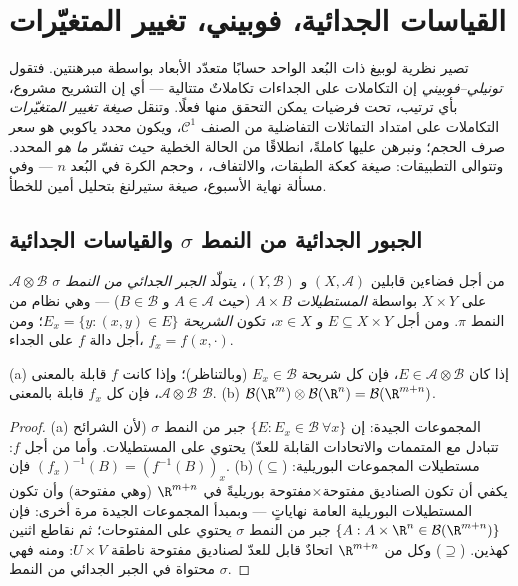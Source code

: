 \chapter{القياسات الجدائية، فوبيني، تغيير المتغيّرات}
\label{ch:b3:product}

تصير نظرية لوبيغ ذات البُعد الواحد حسابًا متعدّد الأبعاد بواسطة
مبرهنتين. فتقول \emph{تونيلي--فوبيني} إن التكاملات على الجداءات
تكاملاتٌ متتالية --- أي إن التشريح مشروع، بأي ترتيب، تحت فرضيات
يمكن التحقق منها فعلًا. وتنقل \emph{صيغة تغيير المتغيّرات}
التكاملات على امتداد التماثلات التفاضلية من الصنف $\mathcal C^1$،
ويكون محدد ياكوبي هو سعر صرف الحجم؛ ونبرهن عليها كاملةً، انطلاقًا
من الحالة الخطية حيث تفسّر \emph{ما هو} المحدد. وتتوالى
التطبيقات: صيغة كعكة الطبقات، والالتفاف، ،
وحجم الكرة في البُعد $n$ --- وفي مسألة نهاية الأسبوع، صيغة
ستيرلنغ بتحليل أمين للخطأ.

\section{الجبور الجدائية من النمط $\sigma$ والقياسات الجدائية}

\begin{definition}\label{def:b3:product:sigma}
من أجل فضاءين قابلين  $(X, \mathcal A)$ و $(Y, \mathcal B)$، يتولّد \emph{الجبر
الجدائي من النمط $\sigma$}
$\mathcal A \otimes \mathcal B$ على $X \times
Y$ بواسطة \emph{المستطيلات} $A \times B$ (حيث $A \in
\mathcal A$
و $B \in \mathcal B$) --- وهي نظام من النمط $\pi$. ومن أجل $E
\subseteq X\times Y$ و $x \in X$،
تكون \emph{الشريحة} $E_x
= \{y : (x,y) \in E\}$؛ ومن أجل دالة $f$ على الجداء،
$f_x = f(x, \cdot)$.
\end{definition}

\begin{proposition}\label{prop:b3:product:sections}
(a) إذا كان $E \in \mathcal A\otimes\mathcal B$، فإن كل شريحة $E_x
\in \mathcal B$ (وبالتناظر)؛ وإذا كانت
$f$ قابلة  بالمعنى $\mathcal
A\otimes\mathcal B$، فإن كل $f_x$ قابلة 
بالمعنى $\mathcal
B$.
(b) $\mathcal B(\R^m)\otimes\mathcal B(\R^n) = \mathcal
B(\R^{m+n})$.
\end{proposition}

\begin{proof}
(a) المجموعات الجيدة: إن $\{E : E_x \in \mathcal B\ \forall x\}$ جبر من النمط $\sigma$ (لأن
الشرائح تتبادل مع المتممات والاتحادات القابلة للعدّ) يحتوي على
المستطيلات. وأما من أجل $f$: فإن $(f_x)^{-1}(B) = (f^{-1}(B))_x$.
(b) ($\subseteq$) مستطيلات المجموعات البوريلية: يكفي أن تكون
الصناديق مفتوحة$\times$مفتوحة بوريليةً في $\R^{m+n}$ (وهي
مفتوحة) وأن تكون المستطيلات البوريلية العامة نهاياتٍ --- وبمبدأ
المجموعات الجيدة مرة أخرى: فإن $\{A : A\times\R^n \in \mathcal B(\R^{m+n})\}$ جبر من النمط $\sigma$
يحتوي على المفتوحات؛ ثم نقاطع اثنين كهذين. ($\supseteq$) وكل
 من $\R^{m+n}$ اتحادٌ قابل للعدّ لصناديق مفتوحة ناطقة
$U\times V$: ومنه فهي محتواة في الجبر الجدائي من النمط $\sigma$.
\end{proof}

